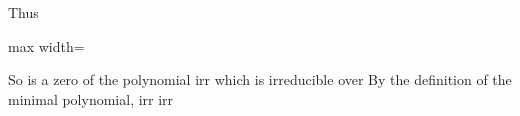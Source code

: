 \documentclass[11pt,oneside]{article}
\begin{document}
\begin{BookBody}
\noindent Thus

\begin{center}\begin{adjustbox}{max width=\linewidth}\end{adjustbox}\end{center}

\noindent So \BookInline{\beta } is a zero of the polynomial  irr which is irreducible over  By the definition of the minimal polynomial, irr irr

\end{BookBody}

\BookNarrativetrue
\end{document}
